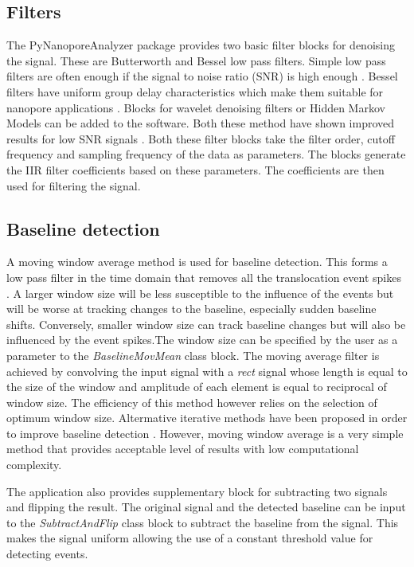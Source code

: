 \documentclass[journal]{IEEEtran}
\begin{document}
\subsection{Filters}
The PyNanoporeAnalyzer package provides two basic filter blocks for denoising the signal. These are Butterworth and Bessel low pass filters. Simple low pass filters are often enough if the signal to noise ratio (SNR) is high enough \cite{plesaDataAnalysisMethods2015,wenGuideSignalProcessing2021}. Bessel filters have uniform group delay characteristics which make them suitable for nanopore applications \cite{colquhounFittingStatisticalAnalysis1983,shekarWaveletDenoisingHighBandwidth2019}. Blocks for wavelet denoising filters or Hidden Markov Models can be added to the software. Both these method have shown improved results for low SNR signals \cite{shekarWaveletDenoisingHighBandwidth2019}. Both these filter blocks take the filter order, cutoff frequency and sampling frequency of the data as parameters. The blocks generate the IIR filter coefficients based on these parameters. The coefficients are then used for filtering the signal.

\subsection{Baseline detection}
A moving window average method is used for baseline detection. This forms a low pass filter in the time domain that removes all the translocation event spikes \cite{smithScientistEngineerGuide1997}. A larger window size will be less susceptible to the influence of the events but will be worse at tracking changes to the baseline, especially sudden baseline shifts. Conversely, smaller window size can track baseline changes but will also be influenced by the event spikes.The window size can be specified by the user as a parameter to the \textit{BaselineMovMean} class block. The moving average filter is achieved by convolving the input signal with a \textit{rect} signal whose length is equal to the size of the window and amplitude of each element is equal to reciprocal of window size. The efficiency of this method however relies on the selection of optimum window size. Altermative iterative methods have been proposed in order to improve baseline detection \cite{plesaDataAnalysisMethods2015,wenGuideSignalProcessing2021}. However, moving window average is a very simple method that provides acceptable level of results with low computational complexity.

The application also provides supplementary block for subtracting two signals and flipping the result. The original signal and the detected baseline can be input to the \textit{SubtractAndFlip} class block to subtract the baseline from the signal. This makes the signal uniform allowing the use of a constant threshold value for detecting events. 
\end{document}
